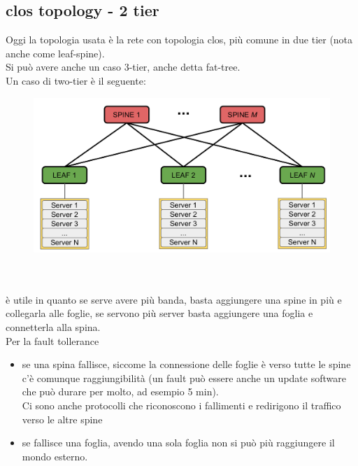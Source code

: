 \documentclass[12pt, oneside]{extbook} %
\begin{document}
\subsection{clos topology - 2 tier}
Oggi la topologia usata è la rete con topologia clos, più comune in due tier (nota anche come leaf-spine).
\\Si può avere anche un caso 3-tier, anche detta fat-tree.
\\Un caso di two-tier è il seguente:\\
\begin{figure}[h!]
    \centering
    \includegraphics[scale=0.5]{../../immagini/2tear_ls}
\end{figure}\\\\
è utile in quanto se serve avere più banda, basta aggiungere una spine in più e collegarla alle foglie, se servono più server basta aggiungere una foglia e connetterla alla spina.
\\Per la fault tollerance
\begin{itemize}
    \item se una spina fallisce, siccome la connessione delle foglie è verso tutte le spine c'è comunque raggiungibilità (un fault può essere anche un update software che può durare per molto, ad esempio 5 min).
    \\Ci sono anche protocolli che riconoscono i fallimenti e redirigono il traffico verso le altre spine
    \item se fallisce una foglia, avendo una sola foglia non si può più raggiungere il mondo esterno.
\end{itemize}
\end{document}
